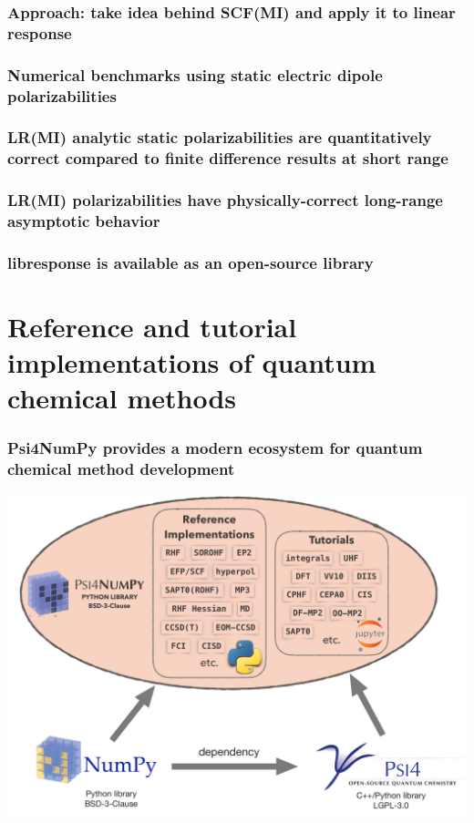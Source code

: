 \documentclass[%
    xcolor=usenames,dvipsnames,svgnames%
]{beamer}
\newcommand\pfn{Psi4NumPy}
\begin{document}
\begin{frame}
  \frametitle{Approach: take idea behind SCF(MI) and apply it to linear response}
\end{frame}

\begin{frame}
  \frametitle{Numerical benchmarks using static electric dipole polarizabilities}
\end{frame}

\begin{frame}
  \frametitle{LR(MI) analytic static polarizabilities are quantitatively correct compared to finite difference results at short range}
\end{frame}

\begin{frame}
  \frametitle{LR(MI) polarizabilities have physically-correct long-range asymptotic behavior}
\end{frame}

\begin{frame}
  \frametitle{libresponse is available as an open-source library}
\end{frame}

\section{Reference and tutorial implementations of quantum chemical methods}

\begin{frame}
  \frametitle{\pfn{} provides a modern ecosystem for quantum chemical method development}
  \centering
  \includegraphics[width=\linewidth,keepaspectratio]{./figures/psi4numpy_ecosystem2.pdf}
\end{frame}
\end{document}
